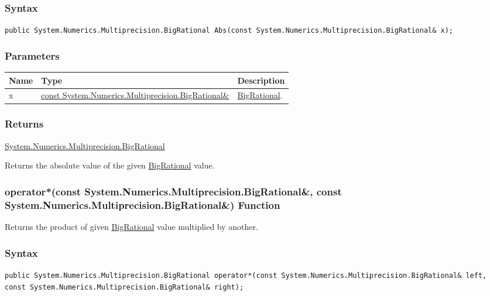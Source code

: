 \documentclass[a4paper,oneside,11.000000pt]{book}
\begin{document}
\subsubsection*{Syntax}
\texttt{public System.Numerics.Multiprecision.BigRational Abs(const System.Numerics.Multiprecision.BigRational\& x);}
\subsubsection*{Parameters}
\begin{flushleft}
\begin{supertabular}[l]{!{\raggedright}p{1.30721cm}!{\raggedright}p{8.55945cm}!{\raggedright}p{3.10422cm}}
\textbf{Name}
& \textbf{Type}
& \textbf{Description}
\\
\hline
x
& \hyperlink{System.Numerics.Multiprecision.BigRational}{const System.\-Numerics.\-Multiprecision.\-BigRational\&\-}
& \hyperlink{System.Numerics.Multiprecision.BigRational}{BigRational}.

\\
\end{supertabular}

\end{flushleft}
\subsubsection*{Returns}
\hyperlink{System.Numerics.Multiprecision.BigRational}{System.\-Numerics.\-Multiprecision.\-BigRational}
\begin{flushleft}
Returns the absolute value of the given \hyperlink{System.Numerics.Multiprecision.BigRational}{BigRational} value.

\end{flushleft}
\clearpage

\hypertarget{System.Numerics.Multiprecision.operator.times.C.R.System.Numerics.Multiprecision.BigRational.C.R.System.Numerics.Multiprecision.BigRational}{\subsubsection*{operator*(const System.Numerics.Multiprecision.BigRational\&, const System.Numerics.Multiprecision.BigRational\&) Function}}
\begin{flushleft}
Returns the product of given \hyperlink{System.Numerics.Multiprecision.BigRational}{BigRational} value multiplied by another.

\end{flushleft}
\subsubsection*{Syntax}
\texttt{public System.Numerics.Multiprecision.BigRational operator*(const System.Numerics.Multiprecision.BigRational\& left, const System.Numerics.Multiprecision.BigRational\& right);}
\end{document}
